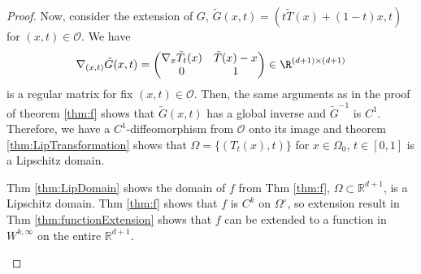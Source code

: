 \begin{proof}
{Now, consider the extension of $G$, $\tilde{G}(x,t) = (t\tilde{T}(x) + (1-t)x, t)$ for $(x,t)\in\mathcal{O}$. We have 
\begin{equation*}
          \nabla_{(x,t)}\tilde{G}(x,t)=\begin{pmatrix}
            \nabla_x \tilde{T}_t(x) & \tilde{T}(x) - x\\
            0 & 1
            \end{pmatrix}\in\R^{(d+1)\times (d+1)}
\end{equation*}
is a regular matrix for fix $(x,t)\in\mathcal{O}$. Then, the same arguments as in the proof of theorem \ref{thm:f} shows that $\tilde{G}(x,t)$ has a global inverse and $\tilde{G}^{-1}$ is $C^1$. Therefore, we have a $C^1$-diffeomorphism from $\mathcal{O}$ onto its image and theorem \ref{thm:LipTransformation} shows that $\Omega = \{(T_t(x),t)\}$ for $x\in\Omega_0$, $t\in[0,1]$ is a Lipschitz domain. 

\begin{remark}
Thm \ref{thm:LipDomain} shows the domain of $f$ from Thm \ref{thm:f}, $\Omega\subset\mathbb{R}^{d+1}$, is a Lipschitz domain. Thm \ref{thm:f} shows that $f$ is $C^k$ on $\Omega^\circ$, so extension result in Thm \ref{thm:functionExtension} shows that $f$ can be extended to a function in $W^{k, \infty}$ on the entire $\mathbb{R}^{d+1}$.
\end{remark}





}
\end{proof}
